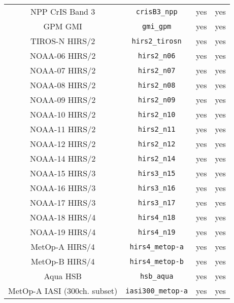 \begin{center}
\begin{longtable}{c c c c}
  NPP CrIS Band 3                    & \texttt{crisB3\_npp}         &  yes     &  yes       \\
  GPM GMI                            & \texttt{gmi\_gpm}            &  yes     &  yes       \\
  TIROS-N HIRS/2                     & \texttt{hirs2\_tirosn}       &  yes     &  yes       \\
  NOAA-06 HIRS/2                     & \texttt{hirs2\_n06}          &  yes     &  yes       \\
  NOAA-07 HIRS/2                     & \texttt{hirs2\_n07}          &  yes     &  yes       \\
  NOAA-08 HIRS/2                     & \texttt{hirs2\_n08}          &  yes     &  yes       \\
  NOAA-09 HIRS/2                     & \texttt{hirs2\_n09}          &  yes     &  yes       \\
  NOAA-10 HIRS/2                     & \texttt{hirs2\_n10}          &  yes     &  yes       \\
  NOAA-11 HIRS/2                     & \texttt{hirs2\_n11}          &  yes     &  yes       \\
  NOAA-12 HIRS/2                     & \texttt{hirs2\_n12}          &  yes     &  yes       \\
  NOAA-14 HIRS/2                     & \texttt{hirs2\_n14}          &  yes     &  yes       \\
  NOAA-15 HIRS/3                     & \texttt{hirs3\_n15}          &  yes     &  yes       \\
  NOAA-16 HIRS/3                     & \texttt{hirs3\_n16}          &  yes     &  yes       \\
  NOAA-17 HIRS/3                     & \texttt{hirs3\_n17}          &  yes     &  yes       \\
  NOAA-18 HIRS/4                     & \texttt{hirs4\_n18}          &  yes     &  yes       \\
  NOAA-19 HIRS/4                     & \texttt{hirs4\_n19}          &  yes     &  yes       \\
  MetOp-A HIRS/4                     & \texttt{hirs4\_metop-a}      &  yes     &  yes       \\
  MetOp-B HIRS/4                     & \texttt{hirs4\_metop-b}      &  yes     &  yes       \\
  Aqua HSB                           & \texttt{hsb\_aqua}           &  yes     &  yes       \\
  MetOp-A IASI (300ch. subset)       & \texttt{iasi300\_metop-a}    &  yes     &  yes       \\

\end{longtable}
\end{center}
